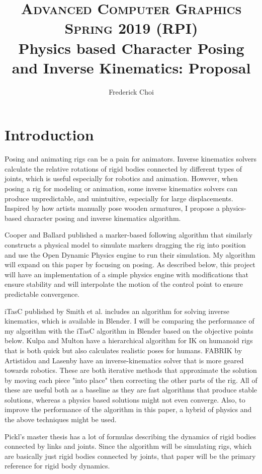 \documentclass[10pt,twocolumn,letterpaper]{article}
\title{
        \usefont{OT1}{bch}{b}{n}
        \normalfont \normalsize \textsc{Advanced Computer Graphics Spring 2019 (RPI)} \\ [10pt]
        \huge Physics based Character Posing and Inverse Kinematics: Proposal \\
}
\author[0]{Frederick Choi}
\begin{document}
\maketitle


\section*{Introduction}
Posing and animating rigs can be a pain for animators. Inverse kinematics solvers calculate the relative rotations of rigid bodies connected by different types of joints, which is useful especially for robotics and animation. However, when posing a rig for modeling or animation, some inverse kinematics solvers can produce unpredictable, and unintuitive, especially for large displacements. Inspired by how artists manually pose wooden armatures, I propose a physics-based character posing and inverse kinematics algorithm.

Cooper and Ballard \cite{Co} published a marker-based following algorithm that similarly constructs a physical model to simulate markers dragging the rig into position and use the Open Dynamic Physics engine to run their simulation. My algorithm will expand on this paper by focusing on posing. As described below, this project will have an implementation of a simple physics engine with modifications that ensure stability and will interpolate the motion of the control point to ensure predictable convergence.

iTasC published by Smith et al. \cite{Sm} includes an algorithm for solving inverse kinematics, which is available in Blender. I will be comparing the performance of my algorithm with the iTasC algorithm in Blender based on the objective points below. Kulpa and Multon \cite{Ku} have a hierarchical algorithm for IK on humanoid rigs that is both quick but also calculates realistic poses for humans. FABRIK by Artistidou and Lasenby \cite{Ar} have an inverse-kinematics solver that is more geared towards robotics. These are both iterative methods that approximate the solution by moving each piece "into place" then correcting the other parts of the rig. All of these are useful both as a baseline as they are fast algorithms that produce stable solutions, whereas a physics based solutions might not even converge. Also, to improve the performance of the algorithm in this paper, a hybrid of physics and the above techniques might be used.

Pickl's master thesis \cite{Pi} has a lot of formulas describing the dynamics of rigid bodies connected by links and joints. Since the algorithm will be simulating rigs, which are basically just rigid bodies connected by joints, that paper will be the primary reference for rigid body dynamics.
\end{document}
